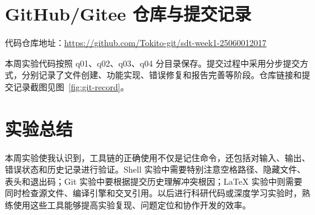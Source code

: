 \documentclass[UTF8,12pt,a4paper]{ctexart}
\begin{document}
\section{GitHub/Gitee 仓库与提交记录}

代码仓库地址：\url{https://github.com/Tokito-git/sdt-week1-25060012017}

本周实验代码按照 q01、q02、q03、q04 分目录保存。提交过程中采用分步提交方式，分别记录了文件创建、功能实现、错误修复和报告完善等阶段。仓库链接和提交记录截图见图~\ref{fig:git-record}。

\section{实验总结}

本周实验使我认识到，工具链的正确使用不仅是记住命令，还包括对输入、输出、错误状态和历史记录进行验证。Shell 实验中需要特别注意空格路径、隐藏文件、表头和退出码；Git 实验中要根据提交历史理解冲突根因；LaTeX 实验中则需要同时检查源文件、编译引擎和交叉引用。以后进行科研代码或深度学习实验时，熟练使用这些工具能够提高实验复现、问题定位和协作开发的效率。
\end{document}

